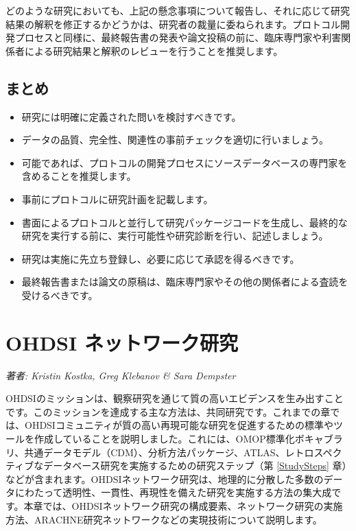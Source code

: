 \documentclass[
  11pt]{book}
\makeatletter
\providecommand{\tightlist}{%
  \setlength{\itemsep}{0pt}\setlength{\parskip}{0pt}}
\newenvironment{kframe}{%
\medskip{}
\setlength{\fboxsep}{.8em}
 \def\at@end@of@kframe{}%
 \ifinner\ifhmode%
  \def\at@end@of@kframe{\end{minipage}}%
  \begin{minipage}{\columnwidth}%
 \fi\fi%
 \def\FrameCommand##1{\hskip\@totalleftmargin \hskip-\fboxsep
 \colorbox{myShadeColor}{##1}\hskip-\fboxsep
     \hskip-\linewidth \hskip-\@totalleftmargin \hskip\columnwidth}%
 \MakeFramed {\advance\hsize-\width
   \@totalleftmargin\z@ \linewidth\hsize
   \@setminipage}}%
 {\par\unskip\endMakeFramed%
 \at@end@of@kframe}
\newenvironment{rmdblock}[1]
  {
  \begin{itemize}
  \renewcommand{\labelitemi}{
    \raisebox{-.7\height}[0pt][0pt]{
      {\setkeys{Gin}{width=3em,keepaspectratio}\texttt{[image: images/\#1]}}
    }
  }
  \setlength{\fboxsep}{1em}
  \begin{kframe}
  \item
  }
  {
  \end{kframe}
  \end{itemize}
  }
\newenvironment{rmdsummary}
  {\begin{rmdblock}{summary}}
  {\end{rmdblock}}
\theoremstyle{definition}
\theoremstyle{definition}
\theoremstyle{definition}
\theoremstyle{definition}
\theoremstyle{remark}
\makeatother
\begin{document}
どのような研究においても、上記の懸念事項について報告し、それに応じて研究結果の解釈を修正するかどうかは、研究者の裁量に委ねられます。プロトコル開発プロセスと同様に、最終報告書の発表や論文投稿の前に、臨床専門家や利害関係者による研究結果と解釈のレビューを行うことを推奨します。

\section{まとめ}\label{ux307eux3068ux3081-16}

\begin{rmdsummary}
\begin{itemize}
\tightlist
\item
  研究には明確に定義された問いを検討すべきです。
\item
  データの品質、完全性、関連性の事前チェックを適切に行いましょう。
\item
  可能であれば、プロトコルの開発プロセスにソースデータベースの専門家を含めることを推奨します。
\item
  事前にプロトコルに研究計画を記載します。
\item
  書面によるプロトコルと並行して研究パッケージコードを生成し、最終的な研究を実行する前に、実行可能性や研究診断を行い、記述しましょう。
\item
  研究は実施に先立ち登録し、必要に応じて承認を得るべきです。
\item
  最終報告書または論文の原稿は、臨床専門家やその他の関係者による査読を受けるべきです。
\end{itemize}
\end{rmdsummary}

\chapter{OHDSI ネットワーク研究}\label{NetworkResearch}

\emph{著者: Kristin Kostka, Greg Klebanov \& Sara Dempster}

OHDSIのミッションは、観察研究を通じて質の高いエビデンスを生み出すことです。このミッションを達成する主な方法は、共同研究です。これまでの章では、OHDSIコミュニティが質の高い再現可能な研究を促進するための標準やツールを作成していることを説明しました。これには、OMOP標準化ボキャブラリ、共通データモデル（CDM）、分析方法パッケージ、ATLAS、レトロスペクティブなデータベース研究を実施するための研究ステップ（第 \ref{StudySteps} 章）などが含まれます。OHDSIネットワーク研究は、地理的に分散した多数のデータにわたって透明性、一貫性、再現性を備えた研究を実施する方法の集大成です。本章では、OHDSIネットワーク研究の構成要素、ネットワーク研究の実施方法、ARACHNE研究ネットワークなどの実現技術について説明します。
\end{document}
